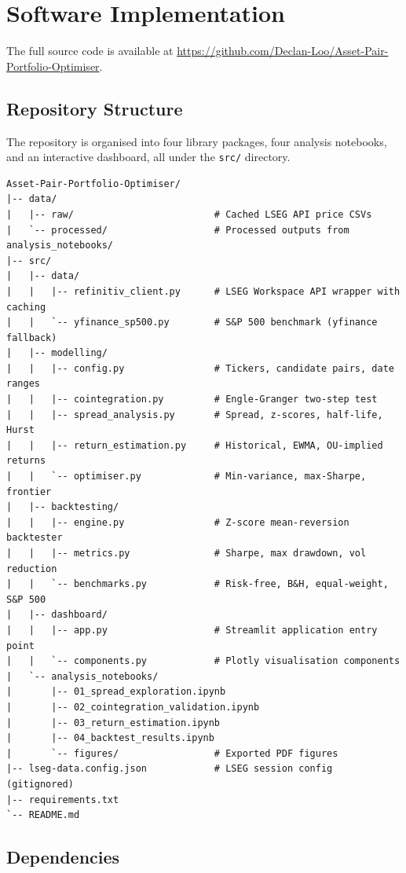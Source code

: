 \documentclass[a4paper]{report}
\begin{document}
\chapter{Software Implementation}

The full source code is available at \href{https://github.com/Declan-Loo/Asset-Pair-Portfolio-Optimiser}{https://github.com/Declan-Loo/Asset-Pair-Portfolio-Optimiser}.

\section{Repository Structure}

The repository is organised into four library packages, four analysis notebooks, and an interactive dashboard, all under the \texttt{src/} directory.

\begin{Verbatim}[fontsize=\small, baselinestretch=0.9]
Asset-Pair-Portfolio-Optimiser/
|-- data/
|   |-- raw/                         # Cached LSEG API price CSVs
|   `-- processed/                   # Processed outputs from analysis_notebooks/
|-- src/
|   |-- data/
|   |   |-- refinitiv_client.py      # LSEG Workspace API wrapper with caching
|   |   `-- yfinance_sp500.py        # S&P 500 benchmark (yfinance fallback)
|   |-- modelling/
|   |   |-- config.py                # Tickers, candidate pairs, date ranges
|   |   |-- cointegration.py         # Engle-Granger two-step test
|   |   |-- spread_analysis.py       # Spread, z-scores, half-life, Hurst
|   |   |-- return_estimation.py     # Historical, EWMA, OU-implied returns
|   |   `-- optimiser.py             # Min-variance, max-Sharpe, frontier
|   |-- backtesting/
|   |   |-- engine.py                # Z-score mean-reversion backtester
|   |   |-- metrics.py               # Sharpe, max drawdown, vol reduction
|   |   `-- benchmarks.py            # Risk-free, B&H, equal-weight, S&P 500
|   |-- dashboard/
|   |   |-- app.py                   # Streamlit application entry point
|   |   `-- components.py            # Plotly visualisation components
|   `-- analysis_notebooks/
|       |-- 01_spread_exploration.ipynb
|       |-- 02_cointegration_validation.ipynb
|       |-- 03_return_estimation.ipynb
|       |-- 04_backtest_results.ipynb
|       `-- figures/                 # Exported PDF figures
|-- lseg-data.config.json            # LSEG session config (gitignored)
|-- requirements.txt
`-- README.md
\end{Verbatim}

\section{Dependencies}
\end{document}
